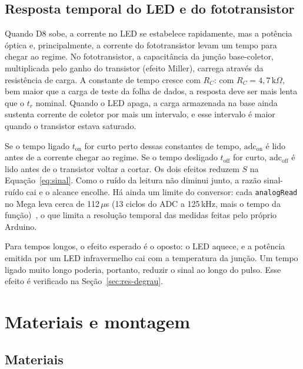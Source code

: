 \documentclass[11pt,a4paper]{article}
\begin{document}
\subsection{Resposta temporal do LED e do fototransistor}
\label{sec:fund-dinamica}

Quando D8 sobe, a corrente no LED se estabelece rapidamente, mas a potência óptica e, principalmente, a corrente do fototransistor levam um tempo para chegar ao regime. No fototransistor, a capacitância da junção base-coletor, multiplicada pelo ganho do transistor (efeito Miller), carrega através da resistência de carga. A constante de tempo cresce com $R_C$: com $R_C = 4{,}7\,\text{k}\Omega$, bem maior que a carga de teste da folha de dados, a resposta deve ser mais lenta que o $t_r$ nominal. Quando o LED apaga, a carga armazenada na base ainda sustenta corrente de coletor por mais um intervalo, e esse intervalo é maior quando o transistor estava saturado.

Se o tempo ligado $t_\text{on}$ for curto perto dessas constantes de tempo, $\text{adc}_\text{on}$ é lido antes de a corrente chegar ao regime. Se o tempo desligado $t_\text{off}$ for curto, $\text{adc}_\text{off}$ é lido antes de o transistor voltar a cortar. Os dois efeitos reduzem $S$ na Equação~\eqref{eq:sinal}. Como o ruído da leitura não diminui junto, a razão sinal-ruído cai e o alcance encolhe. Há ainda um limite do conversor: cada \texttt{analogRead} no Mega leva cerca de 112\,$\mu$s (13 ciclos do ADC a 125\,kHz, mais o tempo da função)~\cite{atmega2560}, o que limita a resolução temporal das medidas feitas pelo próprio Arduino.

Para tempos longos, o efeito esperado é o oposto: o LED aquece, e a potência emitida por um LED infravermelho cai com a temperatura da junção. Um tempo ligado muito longo poderia, portanto, reduzir o sinal ao longo do pulso. Esse efeito é verificado na Seção~\ref{sec:res-degrau}.

\section{Materiais e montagem}
\label{sec:montagem}

\subsection{Materiais}
\end{document}
